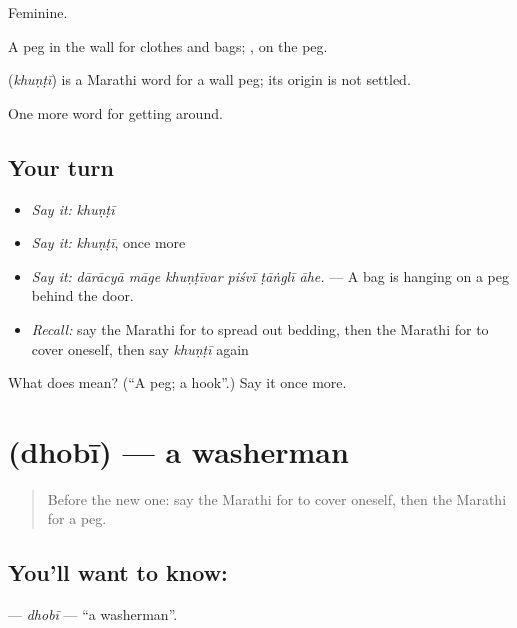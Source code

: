 Feminine.

A peg in the wall for clothes and bags; , on the peg.

\begin{cousinweb}
\textbf{} (\emph{khuṇṭī}) is a Marathi word for a wall peg; its origin is not settled.
\end{cousinweb}

\begin{grammarlens}[title={What you've built}]
One more word for getting around.
\end{grammarlens}

\subsection*{Your turn}
\begin{itemize}
\raggedright
  \item \emph{Say it:} \emph{khuṇṭī}
  \item \emph{Say it:} \emph{khuṇṭī}, once more
  \item \emph{Say it:} \emph{dārācyā māge khuṇṭīvar piśvī ṭāṅglī āhe.} — A bag is hanging on a peg behind the door.
  \item \emph{Recall:} say the Marathi for to spread out bedding, then the Marathi for to cover oneself, then say \emph{khuṇṭī} again
\end{itemize}

\begin{tcolorbox}[breakable,colback=teal!4,colframe=teal!35!black,title={Before you move on}]
What does  mean? (\textquotedblleft{}A peg; a hook\textquotedblright{}.) Say it once more.
\end{tcolorbox}
\section[\texorpdfstring{\mr{धोबी} (dhobī)}{धोबी (dhobī)}]{ (dhobī) — a washerman}

\label{lesson:MR-C416-dhobi}



\begin{quote}
Before the new one: say the Marathi for to cover oneself, then the Marathi for a peg.
\end{quote}

\subsection*{You'll want to know: }
\textbf{} — \emph{dhobī} — \textquotedblleft{}a washerman\textquotedblright{}.

